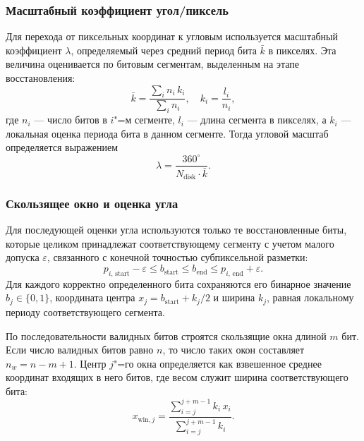 \subsubsection{Масштабный коэффициент угол/пиксель}

Для перехода от пиксельных координат к угловым используется масштабный коэффициент $\lambda$, определяемый через средний период бита $\bar k$ в пикселях. Эта величина оценивается по битовым сегментам, выделенным на этапе восстановления:
\begin{equation}
    \bar k = \frac{\sum_i n_i\,k_i}{\sum_i n_i}, \quad k_i = \frac{l_i}{n_i},
\end{equation}
где $n_i$ --- число битов в $i$"=м сегменте, $l_i$ --- длина сегмента в пикселях, а $k_i$ --- локальная оценка периода бита в данном сегменте. Тогда угловой масштаб определяется выражением
\begin{equation}
    \lambda = \frac{360^\circ}{N_{\mathrm{disk}}\cdot\bar k}.
    \label{eq:angle_per_px}
\end{equation}

\subsubsection{Скользящее окно и оценка угла}

Для последующей оценки угла используются только те восстановленные биты, которые целиком принадлежат соответствующему сегменту с учетом малого допуска $\varepsilon$, связанного с конечной точностью субпиксельной разметки:
\begin{equation}
    p_{i,\,\mathrm{start}} - \varepsilon \leq b_{\mathrm{start}} \leq b_{\mathrm{end}} \leq p_{i,\,\mathrm{end}} + \varepsilon.
\end{equation}
Для каждого корректно определенного бита сохраняются его бинарное значение $b_j \in \{0,1\}$, координата центра $x_j = b_{\mathrm{start}} + k_j/2$ и ширина $k_j$, равная локальному периоду соответствующего сегмента.

По последовательности валидных битов строятся скользящие окна длиной $m$ бит. Если число валидных битов равно $n$, то число таких окон составляет $n_w = n - m + 1$. Центр $j$"=го окна определяется как взвешенное среднее координат входящих в него битов, где весом служит ширина соответствующего бита:
\begin{equation}
    x_{\mathrm{win},j} = \frac{\sum_{i=j}^{j+m-1} k_i\,x_i}{\sum_{i=j}^{j+m-1} k_i}.
    \label{eq:win_center}
\end{equation}

